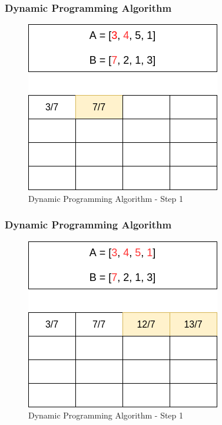 \documentclass{beamer}
\begin{document}
    \begin{frame}
      \frametitle{Dynamic Programming Algorithm}
      
      \begin{figure}
		\centering
		\includegraphics[scale=.48]{dp_2.png}
		\caption{Dynamic Programming Algorithm - Step 1}
		\label{fig:dynamic_programming_algorithm_2}
	  \end{figure}
      
    \end{frame}
    
    \begin{frame}
      \frametitle{Dynamic Programming Algorithm}
      
      \begin{figure}
		\centering
		\includegraphics[scale=.48]{dp_3.png}
		\caption{Dynamic Programming Algorithm - Step 1}
		\label{fig:dynamic_programming_algorithm_3}
	  \end{figure}
      
    \end{frame}
    
\end{document}
